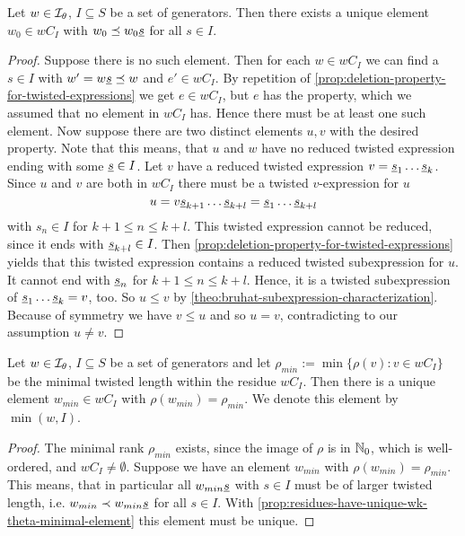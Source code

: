 \begin{prop}
	Let $w \in \mathcal{I}_{\theta}$, $I \subseteq S$ be a set of generators. Then there exists a unique element $w_0 \in wC_I$ with $w_0 \preceq w_0 \underline{s}$ for all $s \in I$.

	\begin{proof}
		Suppose there is no such element. Then for each $w \in wC_I$ we can find a $s \in I$ with $w' = w \underline{s} \preceq w$ and $e' \in wC_I$. By repetition of \ref{prop:deletion-property-for-twisted-expressions} we get $e \in wC_I$, but $e$ has the property, which we assumed that no element in $wC_I$ has. Hence there must be at least one such element. Now suppose there are two distinct elements $u,v$ with the desired property. Note that this means, that $u$ and $w$ have no reduced twisted expression ending with some $\underline{s} \in I$. Let $v$ have a reduced twisted expression $v = \underline{s}_1 \ldots \underline{s}_k$. Since $u$ and $v$ are both in $wC_I$ there must be a twisted $v$-expression for $u$
		$$ u = v \underline{s}_{k+1} \ldots \underline{s}_{k+l} = \underline{s}_1 \ldots \underline{s}_{k+l} $$
		with $s_n \in I$ for $k+1 \leq n \leq k+l$. This twisted expression cannot be reduced, since it ends with $\underline{s}_{k+l} \in I$. Then \ref{prop:deletion-property-for-twisted-expressions} yields that this twisted expression contains a reduced twisted subexpression for $u$. It cannot end with $\underline{s}_n$ for $k+1 \leq n \leq k+l$. Hence, it is a twisted subexpression of $\underline{s}_1 \ldots \underline{s}_k = v$, too. So $u \leq v$ by \ref{theo:bruhat-subexpression-characterization}. Because of symmetry we have $v \leq u$ and so $u = v$, contradicting to our assumption $u \neq v$.
	\end{proof}
\end{prop}

\begin{coro}
	Let $w \in \mathcal{I}_{\theta}$, $I \subseteq S$ be a set of generators and let $\rho_{min} := \min \{ \rho(v) : v \in wC_I \}$ be the minimal twisted length within the residue $wC_I$. Then there is a unique element $w_{min} \in wC_I$ with $\rho(w_{min}) = \rho_{min}$. We denote this element by $\min(w,I)$.

	\begin{proof}
		The minimal rank $\rho_{min}$ exists, since the image of $\rho$ is in $\mathbb{N}_0$, which is well-ordered, and $wC_I \neq \emptyset$. Suppose we have an element $w_{min}$ with $\rho(w_{min}) = \rho_{min}$. This means, that in particular all $w_{min} \underline{s}$ with $s \in I$ must be of larger twisted length, i.e. $w_{min} \prec w_{min} \underline{s}$ for all $s \in I$. With \ref{prop:residues-have-unique-wk-theta-minimal-element} this element must be unique.
	\end{proof}
\end{coro}

